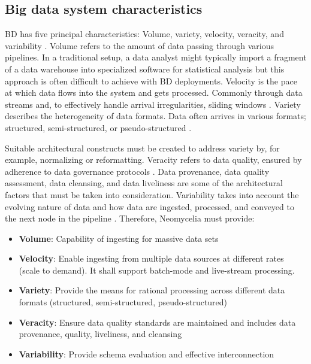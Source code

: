 \documentclass[conference]{IEEEtran}
\begin{document}
\subsection{Big data system characteristics}

BD has five principal characteristics: Volume, variety, velocity, veracity, and variability \cite{Nadal,AtaeiHype}. Volume refers to the amount of data passing through various pipelines. In a traditional setup, a data analyst might typically import a fragment of a data warehouse into specialized software for statistical analysis \cite{Ordonez} but this approach is often difficult to achieve with BD deployments. Velocity is the pace at which data flows into the system and gets processed. Commonly through data streams and, to effectively handle arrival irregularities, sliding windows \cite{Babcock}. Variety describes the heterogeneity of data formats. Data often arrives in various formats; structured, semi-structured, or pseudo-structured \cite{Terrizzano,AtaeiBigDataEnvirons}.

Suitable architectural constructs must be created to address variety by, for example, normalizing or reformatting. Veracity refers to data quality, ensured by adherence to data governance protocols \cite{Plotkin}. Data provenance, data quality assessment, data cleansing, and data liveliness are some of the architectural factors that must be taken into consideration. Variability takes into account the evolving nature of data and how data are ingested, processed, and conveyed to the next node in the pipeline \cite{Nadal}. Therefore, Neomycelia must provide:

\begin{itemize}
    \item \textbf{Volume}: Capability of ingesting for massive data sets
    \item \textbf{Velocity}: Enable ingesting from multiple data sources at different rates (scale to demand). It shall support batch-mode and live-stream processing.
    \item \textbf{Variety}: Provide the means for rational processing across different data formats (structured, semi-structured, pseudo-structured)
    \item \textbf{Veracity}: Ensure data quality standards are maintained and includes data provenance, quality, liveliness, and cleansing
    \item \textbf{Variability}: Provide schema evaluation and effective interconnection
\end{itemize}
\end{document}
